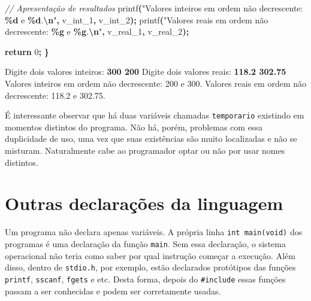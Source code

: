\documentclass[
  11pt,
  a4paper,
]{scrbook}
\newenvironment{Shaded}{\begin{snugshade}}{\end{snugshade}}
\newcommand{\CommentTok}[1]{\textcolor[rgb]{0.56,0.35,0.01}{\textit{#1}}}
\newcommand{\ControlFlowTok}[1]{\textcolor[rgb]{0.13,0.29,0.53}{\textbf{#1}}}
\newcommand{\DecValTok}[1]{\textcolor[rgb]{0.00,0.00,0.81}{#1}}
\newcommand{\KeywordTok}[1]{\textcolor[rgb]{0.13,0.29,0.53}{\textbf{#1}}}
\newcommand{\NormalTok}[1]{#1}
\newcommand{\OperatorTok}[1]{\textcolor[rgb]{0.81,0.36,0.00}{\textbf{#1}}}
\newcommand{\SpecialCharTok}[1]{\textcolor[rgb]{0.81,0.36,0.00}{\textbf{#1}}}
\newcommand{\StringTok}[1]{\textcolor[rgb]{0.31,0.60,0.02}{#1}}
\begin{document}
\begin{Shaded}
\begin{Highlighting}[]
    \CommentTok{// Apresentação de resultados}
\NormalTok{    printf}\OperatorTok{(}\StringTok{"Valores inteiros em ordem não decrescente: }\SpecialCharTok{\%d}\StringTok{ e }\SpecialCharTok{\%d}\StringTok{.}\SpecialCharTok{\textbackslash{}n}\StringTok{"}\OperatorTok{,}
\NormalTok{           v\_int\_1}\OperatorTok{,}\NormalTok{ v\_int\_2}\OperatorTok{);}
\NormalTok{    printf}\OperatorTok{(}\StringTok{"Valores reais em ordem não decrescente: }\SpecialCharTok{\%g}\StringTok{ e }\SpecialCharTok{\%g}\StringTok{.}\SpecialCharTok{\textbackslash{}n}\StringTok{"}\OperatorTok{,}
\NormalTok{           v\_real\_1}\OperatorTok{,}\NormalTok{ v\_real\_2}\OperatorTok{);}

    \ControlFlowTok{return} \DecValTok{0}\OperatorTok{;}
\OperatorTok{\}}
\end{Highlighting}
\end{Shaded}

\begin{Shaded}
\begin{Highlighting}[]
\NormalTok{Digite dois valores inteiros: }\KeywordTok{ 300 200 }
\NormalTok{Digite dois valores reais: }\KeywordTok{ 118.2 302.75 }
\NormalTok{Valores inteiros em ordem não decrescente: 200 e 300.}
\NormalTok{Valores reais em ordem não decrescente: 118.2 e 302.75.}
\end{Highlighting}
\end{Shaded}

É interessante observar que há duas variáveis chamadas
\texttt{temporario} existindo em momentos distintos do programa. Não há,
porém, problemas com essa duplicidade de uso, uma vez que suas
existências são muito localizadas e não se misturam. Naturalmente cabe
ao programador optar ou não por usar nomes distintos.

\section{Outras declarações da
linguagem}\label{outras-declarauxe7uxf5es-da-linguagem}

Um programa não declara apenas variáveis. A própria linha
\texttt{int\ main(void)} dos programas é uma declaração da função
\texttt{main}. Sem essa declaração, o sistema operacional não teria como
saber por qual instrução começar a execução. Além disso, dentro de
\texttt{stdio.h}, por exemplo, estão declarados protótipos das funções
\texttt{printf}, \texttt{sscanf}, \texttt{fgets} e etc. Desta forma,
depois do \texttt{\#include} essas funções passam a ser conhecidas e
podem ser corretamente usadas.
\end{document}
